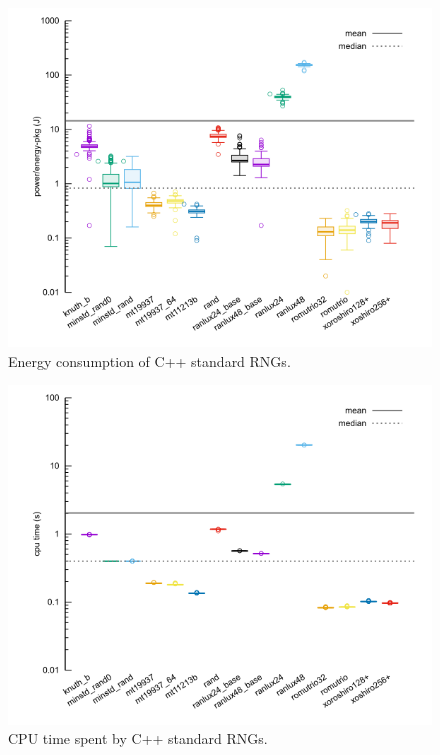 \documentclass[dvipsnames,format=sigconf,anonymous=true,review=true]{acmart}
\begin{document}
\begin{figure}
\centering
\includegraphics[width=\columnwidth]{pkg.png}
\caption{Energy consumption of C++ standard RNGs.}
\label{fig:pkg}
\end{figure}

\begin{figure}
\centering
\includegraphics[width=\columnwidth]{cpu.png}
\caption{CPU time spent by C++ standard RNGs.}
\label{fig:cpu}
\end{figure}

\end{document}
